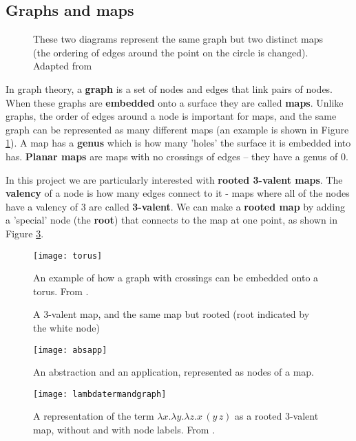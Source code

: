 \documentclass[11pt]{article}
\providecommand{\shortcite}[1]{\cite{#1}}
\begin{document}
\subsection{Graphs and maps}

\begin{figure}
    \centering
    
    \caption{These two diagrams represent the same graph but two distinct maps (the ordering of edges around the point on the circle is changed). Adapted from {\cite{graphs}}}
    \label{fig:maps}
\end{figure}

In graph theory, a \textbf{graph} is a set of nodes and edges that link pairs of nodes. When these graphs are \textbf{embedded} onto a surface they are called \textbf{maps}. Unlike graphs, the order of edges around a node is important for maps, and the same graph can be represented as many different maps (an example is shown in Figure \ref{fig:maps}). A map has a \textbf{genus} which is how many 'holes' the surface it is embedded into has. \textbf{Planar maps} are maps with no crossings of edges -- they have a genus of 0. 

In this project we are particularly interested with \textbf{rooted 3-valent maps}. The \textbf{valency} of a node is how many edges connect to it - maps where all of the nodes have a valency of 3 are called \textbf{3-valent}. We can make a \textbf{rooted map} by adding a 'special' node (the \textbf{root}) that connects to the map at one point, as shown in Figure \ref{fig:trivalentrooted}.

\begin{figure}
    \centering
    \texttt{[image: torus]}
    \caption{An example of how a graph with crossings can be embedded onto a torus. From \shortcite{zeil4ct}.}
    \label{fig:torus}
\end{figure}

\begin{figure}
    \centering
    
    \caption{A 3-valent map, and the same map but rooted (root indicated by the white node)}
    \label{fig:trivalentrooted}
\end{figure}

\begin{figure}
    \centering
    \texttt{[image: absapp]}
    \caption{An abstraction and an application, represented as nodes of a map.}
    \label{fig:absapp}
\end{figure}

\begin{figure}
    \centering
    \texttt{[image: lambdatermandgraph]}
    \caption{A representation of the term $\lambda x. \lambda y. \lambda z. x \, (y \, z)$ as a rooted 3-valent map, without and with node labels. From \protect\cite{zeiljfp}.}
    \label{fig:lambdatermandgrapht}
\end{figure}
\end{document}
